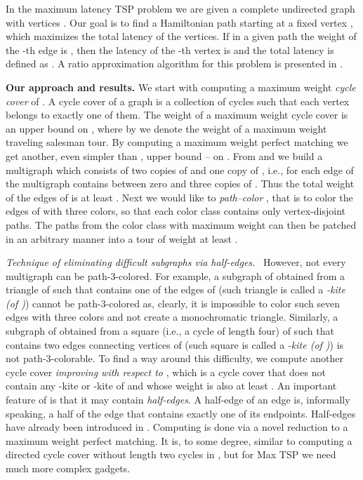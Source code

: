 \documentclass[a4, 11pt]{article}
\newcommand{\<}{\langle}
\renewcommand{\>}{\rangle}
\begin{document}
In the maximum latency TSP problem  we are given a complete undirected graph with vertices . Our goal is to find a Hamiltonian path starting at a fixed vertex , which maximizes the total latency of the vertices. If in a given path  the weight of the -th edge is , then the latency of the -th vertex is  and the total latency is defined as . A ratio   approximation algorithm for this problem is presented in \cite{motwani}.

{\bf Our approach and results.} We start with computing a maximum weight {\em cycle cover}   of . A cycle cover of a graph  is  a collection of cycles such  that each vertex belongs to exactly one of them. The weight of a maximum weight cycle cover  is an upper bound on , where by  we denote the weight of a maximum weight traveling salesman tour.  By computing a maximum weight perfect matching  we get another, even simpler than ,  upper bound -- on . From  and  we build a multigraph  which consists of two copies of  and one copy of , i.e.,  for each edge  of   the multigraph  contains between zero and three copies of . Thus the total weight of the edges of  is at least .  Next we would like to  {\em path--color} , that is  to color the edges of  with three colors, so that each color class
contains only vertex-disjoint paths. The paths from  the color class with maximum weight can then be patched in an arbitrary manner  into a tour of weight at least .



{\em Technique of eliminating difficult subgraphs via half-edges.} \  However, not every multigraph  can be path-3-colored. For example, a subgraph of  obtained  from a triangle    of   such that   contains one of the edges of  (such triangle is called a {\em -kite (of )}) cannot be path-3-colored as, clearly,  it is impossible to color such seven edges  with three colors and not create a monochromatic triangle.
Similarly, a subgraph of  obtained from a square   (i.e., a cycle of length four) of   such that   contains two edges connecting vertices of   (such square is called a {\em -kite (of )}) is not path-3-colorable. To find a way around this difficulty, we compute another cycle cover  {\em
improving  with respect to }, which is a cycle cover that does not contain any -kite or -kite of  and whose weight is also at least .  An important feature of  is that it may contain
{\em half-edges}. A half-edge of an edge  is, informally speaking, a half of the edge  that contains exactly one of its endpoints. Half-edges have already been introduced in \cite{PEZ}. Computing  is done via a novel reduction to a maximum weight perfect matching. It is, to some degree, similar to computing a directed cycle cover without  length two cycles in \cite{PEZ}, but for Max TSP we need much more complex gadgets. 
\end{document}
